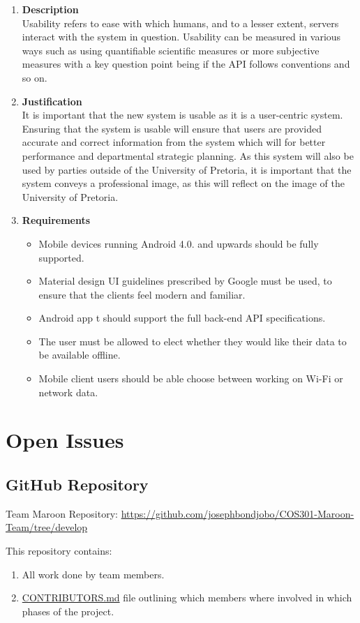 \documentclass[a4paper,10pt]{article}
\begin{document}
\begin{enumerate}
\item \textbf{Description} \\
Usability refers to ease with which humans, and to a lesser extent, servers interact with the system in question. Usability can be measured in various ways such as using quantifiable scientific measures or more subjective measures with a key question point being if the API follows conventions and so on.
\item \textbf{Justification} \\
It is important that the new system is usable as it is a user-centric system. Ensuring that the system is usable will ensure that users are provided accurate and correct information from the system which will for better performance and departmental strategic planning. As this system will also be used by parties outside of the University of Pretoria, it is important that the system conveys a professional image, as this will reflect on the image of the University of Pretoria. 
\item \textbf{Requirements}
	\begin{itemize}
		\item Mobile devices running Android 4.0. and upwards should be fully supported.
		\item Material design UI guidelines prescribed by Google must be used, to ensure that the clients feel modern and familiar. 
		\item Android app t should support the full back-end API specifications.
		\item The user must be allowed to elect whether they would like their data to be available offline.
		\item Mobile client users should be able choose between working on Wi-Fi  or network data. 
	\end{itemize}
\end{enumerate}

\clearpage
\section{Open Issues}
\subsection {GitHub Repository}
Team Maroon Repository: \url{https://github.com/josephbondjobo/COS301-Maroon-Team/tree/develop}

This repository contains:
\begin{enumerate}
\item All work done by team members.
\item \href{https://github.com/josephbondjobo/COS301-Maroon-Team/blob/develop/Intro/Contributors.md}{CONTRIBUTORS.md} file outlining which members where involved in which phases of the project.
\end{enumerate}

\newpage
\clearpage
{}
\end{document}
